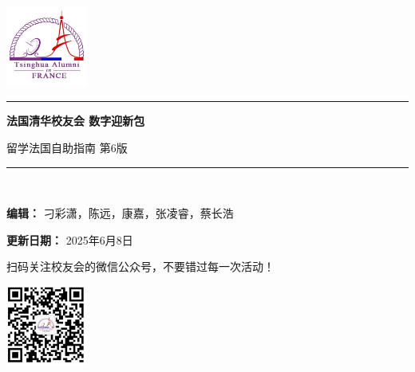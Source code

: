 \documentclass[UTF8]{ctexart}
\newcommand\titleofdoc{\bfseries 法国清华校友会 数字迎新包}
\begin{document}
\begin{titlepage}
   \begin{center}
   
        \vspace{4 cm} 
        
        {\includegraphics[width=0.2\textwidth]{images/Logo.jpg}}\\

        \vspace{0.5 cm} 
        
        \noindent\rule[0.25\baselineskip]{\textwidth}{1pt}
        
        \vspace{0.5 cm} 
        
        \Huge{\titleofdoc} 

        \vspace{0.5cm}
        
        \LARGE{留学法国自助指南 第6版}
        
        \vspace{1 cm} 
        
        \noindent\rule[0.25\baselineskip]{\textwidth}{1pt}\\
        
        \vspace{1 cm}

        \large{\textbf{编辑：} 刁彩潇，陈远，康嘉，张凌睿，蔡长浩}\\

        \vspace{0.3 cm}

        \large{\textbf{更新日期：} 2025年6月8日}\\

        \vspace{1 cm}

        \large{扫码关注校友会的微信公众号，不要错过每一次活动！}\\

        \vspace{0.5 cm} 
        
        {\includegraphics[width=0.2\textwidth]{images/QRcode.png}}\\


\end{center}
\end{titlepage}
\end{document}
